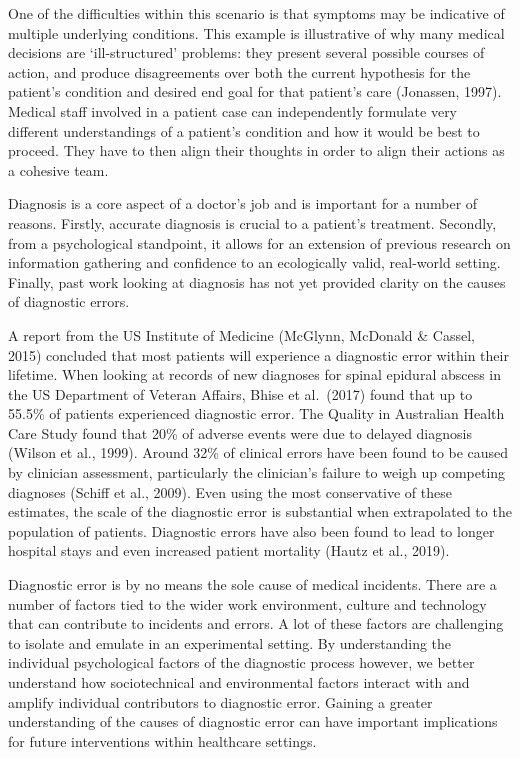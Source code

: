 \documentclass[a4paper, nobind]{templates/ociamthesis}
\begin{document}
One of the difficulties within this scenario is that symptoms may be indicative of multiple underlying conditions. This example is illustrative of why many medical decisions are `ill-structured' problems: they present several possible courses of action, and produce disagreements over both the current hypothesis for the patient's condition and desired end goal for that patient's care (Jonassen, 1997). Medical staff involved in a patient case can independently formulate very different understandings of a patient's condition and how it would be best to proceed. They have to then align their thoughts in order to align their actions as a cohesive team.

Diagnosis is a core aspect of a doctor's job and is important for a number of reasons. Firstly, accurate diagnosis is crucial to a patient's treatment. Secondly, from a psychological standpoint, it allows for an extension of previous research on information gathering and confidence to an ecologically valid, real-world setting. Finally, past work looking at diagnosis has not yet provided clarity on the causes of diagnostic errors.

A report from the US Institute of Medicine (McGlynn, McDonald \& Cassel, 2015) concluded that most patients will experience a diagnostic error within their lifetime. When looking at records of new diagnoses for spinal epidural abscess in the US Department of Veteran Affairs, Bhise et al.~(2017) found that up to 55.5\% of patients experienced diagnostic error. The Quality in Australian Health Care Study found that 20\% of adverse events were due to delayed diagnosis (Wilson et al., 1999). Around 32\% of clinical errors have been found to be caused by clinician assessment, particularly the clinician's failure to weigh up competing diagnoses (Schiff et al., 2009). Even using the most conservative of these estimates, the scale of the diagnostic error is substantial when extrapolated to the population of patients. Diagnostic errors have also been found to lead to longer hospital stays and even increased patient mortality (Hautz et al., 2019).

Diagnostic error is by no means the sole cause of medical incidents. There are a number of factors tied to the wider work environment, culture and technology that can contribute to incidents and errors. A lot of these factors are challenging to isolate and emulate in an experimental setting. By understanding the individual psychological factors of the diagnostic process however, we better understand how sociotechnical and environmental factors interact with and amplify individual contributors to diagnostic error. Gaining a greater understanding of the causes of diagnostic error can have important implications for future interventions within healthcare settings.
\end{document}
